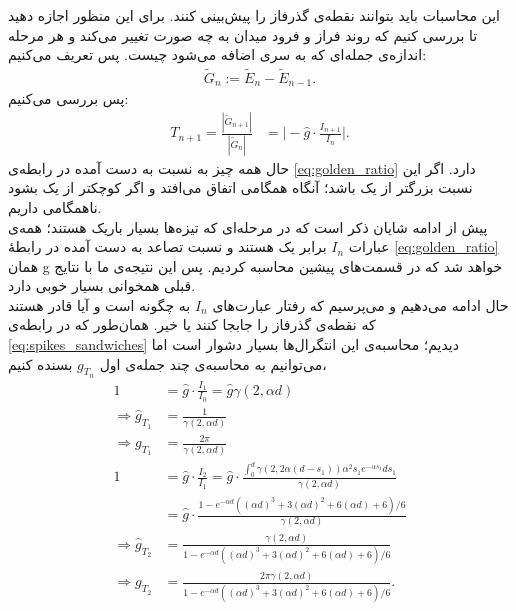 این محاسبات باید بتوانند نقطه‌ی گذرفاز را پیش‌بینی کنند. برای این منظور اجازه دهید تا بررسی کنیم که روند فراز و فرود میدان به چه صورت تغییر می‌کند و هر مرحله اندازه‌ی جمله‌ای که به سری اضافه می‌شود چیست. پس تعریف می‌کنیم:
\begin{align}
	\tilde{G}_{n} := \tilde{E}_{n} - \tilde{E}_{n-1} .
\end{align}
پس بررسی می‌کنیم:
\begin{align}
	T_{n+1} = \frac{|\tilde{G}_{n+1}|}{|\tilde{G}_{n}|} &= \big|-\hat{g} \cdot \frac{I_{n+1}}{I_n}\big| .
	\label{eq:golden_ratio}
\end{align}
حال همه چیز به نسبت به دست آمده در رابطه‌ی
\ref{eq:golden_ratio}
دارد. اگر این نسبت بزرگتر از یک باشد؛ آنگاه همگامی اتفاق می‌افتد و اگر کوچکتر از یک بشود ناهمگامی داریم.\\
پیش از ادامه شایان ذکر است که در مرحله‌ای که تیزه‌ها بسیار باریک هستند؛ همه‌ی عبارات 
$I_n$
برابر یک هستند و نسبت تصاعد به دست آمده در رابطهٔ 
\ref{eq:golden_ratio}
همان g خواهد شد که در قسمت‌های پیشین محاسبه کردیم. پس این نتیجه‌ی ما با نتایج قبلی همخوانی بسیار خوبی دارد.\\

حال ادامه می‌دهیم و می‌پرسیم که رفتار عبارت‌های 
$I_n$
به چگونه است و آیا قادر هستند که نقطه‌ی گذرفاز را جابجا کنند یا خیر. همان‌طور که در رابطه‌ی 
\ref{eq:spikes_sandwiches}
دیدیم؛ محاسبه‌ی این انتگرال‌ها بسیار دشوار است اما می‌توانیم به محاسبه‌ی چند جمله‌ی اول 
$g_{T_n}$
بسنده کنیم،
\begin{align}
	1 &= \hat{g} \cdot \frac{I_1}{I_0} = \hat{g} \gamma(2,\alpha d)\\
	\Rightarrow \hat{g}_{T_1} &= \frac{1}{\gamma(2,\alpha d)}\\
	\Rightarrow g_{T_1} &= \frac{2\pi}{\gamma(2,\alpha d)}\\
	1 &= \hat{g} \cdot \frac{I_2}{I_1} = \hat{g} \cdot \frac{\int_0^{d} \gamma(2,2\alpha (d-s_1)) \alpha^2 s_1 e^{-\alpha s_1} ds_1 }{\gamma(2,\alpha d)}\\
	&= \hat{g} \cdot \frac{1 - e^{- \alpha d}( (\alpha d)^3 + 3(\alpha d)^2 + 6(\alpha d) + 6)/6}{\gamma(2,\alpha d)}\\
	\Rightarrow \hat{g}_{T_2} &= \frac{\gamma(2,\alpha d)}{1 - e^{- \alpha d}( (\alpha d)^3 + 3(\alpha d)^2 + 6(\alpha d) + 6)/6}\\
	\Rightarrow g_{T_2} &= \frac{2\pi \gamma(2,\alpha d)}{1 - e^{- \alpha d}( (\alpha d)^3 + 3(\alpha d)^2 + 6(\alpha d) + 6)/6} .
\end{align}

